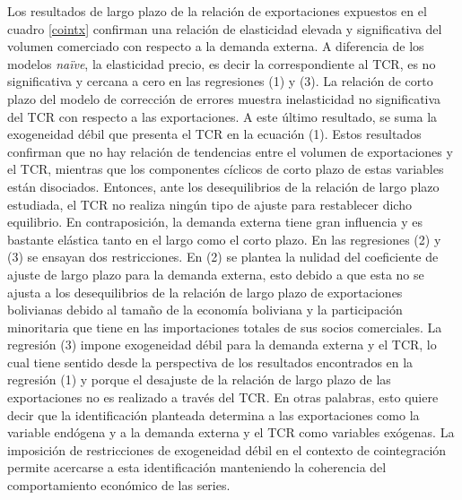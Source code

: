 \documentclass[12pt,letterpaper]{article}
\begin{document}
Los resultados de largo plazo de la relación de exportaciones expuestos en el cuadro \ref{cointx} confirman una relación de elasticidad elevada y significativa del volumen comerciado con respecto a la demanda externa. A diferencia de los modelos \emph{naïve}, la elasticidad precio, es decir la correspondiente al TCR, es no significativa y cercana a cero en las regresiones (1) y (3). La relación de corto plazo del modelo de corrección de errores muestra inelasticidad no significativa del TCR con respecto a las exportaciones. A este último resultado, se suma la exogeneidad débil que presenta el TCR en la ecuación (1). Estos resultados confirman que no hay relación de tendencias entre el volumen de exportaciones y el TCR, mientras que los componentes cíclicos de corto plazo de estas variables están disociados. Entonces, ante los desequilibrios de la relación de largo plazo estudiada, el TCR no realiza ningún tipo de ajuste para restablecer dicho equilibrio. En contraposición, la demanda externa tiene gran influencia y es bastante elástica tanto en el largo como el corto plazo. En las regresiones (2) y (3) se ensayan dos restricciones. En (2) se plantea la nulidad del coeficiente de ajuste de largo plazo para la demanda externa, esto debido a que esta no se ajusta a los desequilibrios de la relación de largo plazo de exportaciones bolivianas debido al tamaño de la economía boliviana y la participación minoritaria que tiene en las importaciones totales de sus socios comerciales. La regresión (3) impone exogeneidad débil para la demanda externa y el TCR, lo cual tiene sentido desde la perspectiva de los resultados encontrados en la regresión (1) y porque el desajuste de la relación de largo plazo de las exportaciones no es realizado a través del TCR. En otras palabras, esto quiere decir que la identificación planteada determina a las exportaciones como la variable endógena y a la demanda externa y el TCR como variables exógenas. La imposición de restricciones de exogeneidad débil en el contexto de cointegración permite acercarse a esta identificación manteniendo la coherencia del comportamiento económico de las series.
\end{document}
